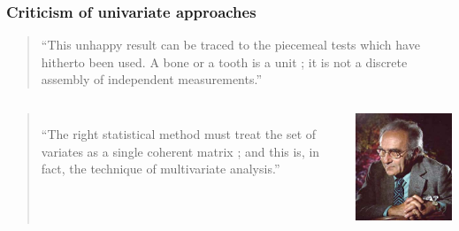\begin{frame}
\frametitle{Criticism of univariate approaches}
\begin{quote}
``This unhappy result can be traced to the piecemeal tests which have hitherto been used. A bone or a tooth is a unit ; it is not a discrete assembly of independent measurements.''
\par {}
\end{quote}
\begin{columns}[c]
\begin{quote}
``The right statistical method must treat the set of variates as a single coherent matrix ; and this is, in fact, the technique of multivariate analysis.''
\par {}
\end{quote}
\includegraphics[width=\textwidth]{Bronowski}
\end{columns}
\end{frame}



